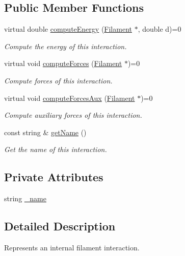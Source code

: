 \subsection*{Public Member Functions}
\begin{DoxyCompactItemize}
\item 
virtual double \hyperlink{classFilamentInteractions_ac67b5179bc0e843307edc1eb3d84722c}{compute\+Energy} (\hyperlink{classFilament}{Filament} $\ast$, double d)=0
\begin{DoxyCompactList}\small\item\em Compute the energy of this interaction. \end{DoxyCompactList}\item 
virtual void \hyperlink{classFilamentInteractions_aa6747042a647d8d9d53cb437afc06f8b}{compute\+Forces} (\hyperlink{classFilament}{Filament} $\ast$)=0
\begin{DoxyCompactList}\small\item\em Compute forces of this interaction. \end{DoxyCompactList}\item 
virtual void \hyperlink{classFilamentInteractions_a77233ea2da56eaffe0bdea79c310d818}{compute\+Forces\+Aux} (\hyperlink{classFilament}{Filament} $\ast$)=0
\begin{DoxyCompactList}\small\item\em Compute auxiliary forces of this interaction. \end{DoxyCompactList}\item 
const string \& \hyperlink{classFilamentInteractions_af3c391f24ffbb7088de189cdb209d650}{get\+Name} ()
\begin{DoxyCompactList}\small\item\em Get the name of this interaction. \end{DoxyCompactList}\end{DoxyCompactItemize}
\subsection*{Private Attributes}
\begin{DoxyCompactItemize}
\item 
string \hyperlink{classFilamentInteractions_a5b2e160dc98547ff6613a989100083b5}{\+\_\+name}
\end{DoxyCompactItemize}


\subsection{Detailed Description}
Represents an internal filament interaction. 

